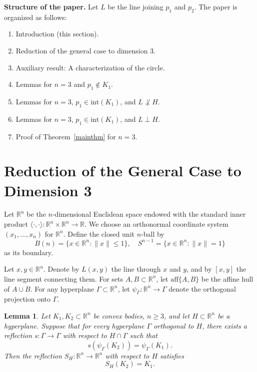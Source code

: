 \documentclass[12pt]{article}
\newtheorem{lemma}{Lemma}
\begin{document}
\textbf{Structure of the paper.} Let $L$ be the line joining $p_1$ and $p_2$. The paper is organized as follows:
\begin{enumerate}
	\item Introduction (this section).
	\item Reduction of the general case to dimension 3.
	\item Auxiliary result: A characterization of the circle.
	\item Lemmas for $n = 3$ and $p_1 \notin K_1$.
	\item Lemmas for $n = 3$, $p_1 \in \mathrm{int}(K_1)$, and $L \not\perp H$.
	\item Lemmas for $n = 3$, $p_1 \in \mathrm{int}(K_1)$, and $L \perp H$.
	\item Proof of Theorem~\ref{mainthm} for $n = 3$.
\end{enumerate}

	
	
	\section{Reduction of the General Case to Dimension 3}
	
	Let $\mathbb{R}^n$ be the $n$-dimensional Euclidean space endowed with the standard inner product $\langle \cdot, \cdot \rangle : \mathbb{R}^n \times \mathbb{R}^n \to \mathbb{R}$. We choose an orthonormal coordinate system $(x_1, \dots, x_n)$ for $\mathbb{R}^n$. Define the closed unit $n$-ball by
	\[
	B(n) = \{x \in \mathbb{R}^n : \|x\| \leq 1\}, \quad S^{n-1} = \{x \in \mathbb{R}^n : \|x\| = 1\}
	\]
	as its boundary.
	
	Let $x, y \in \mathbb{R}^n$. Denote by $L(x, y)$ the line through $x$ and $y$, and by $[x, y]$ the line segment connecting them. For sets $A, B \subset \mathbb{R}^n$, let $\mathrm{aff}\{A, B\}$ be the affine hull of $A \cup B$. For any hyperplane $\Gamma \subset \mathbb{R}^n$, let $\psi_\Gamma : \mathbb{R}^n \to \Gamma$ denote the orthogonal projection onto $\Gamma$.
	
	\begin{lemma}
		Let $K_1, K_2 \subset \mathbb{R}^n$ be convex bodies, $n \geq 3$, and let $H \subset \mathbb{R}^n$ be a hyperplane. Suppose that for every hyperplane $\Gamma$ orthogonal to $H$, there exists a reflection $s : \Gamma \to \Gamma$ with respect to $H \cap \Gamma$ such that
		\[
		s(\psi_\Gamma(K_2)) = \psi_\Gamma(K_1).
		\]
		Then the reflection $S_H : \mathbb{R}^n \to \mathbb{R}^n$ with respect to $H$ satisfies
		\[
		S_H(K_2) = K_1.
		\]
	\end{lemma}
	
\end{document}
